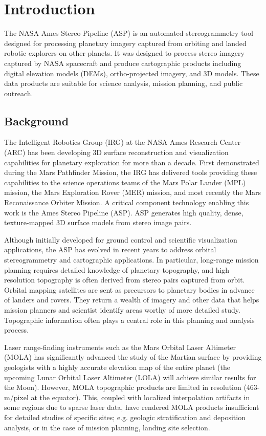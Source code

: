 \chapter{Introduction}

The NASA Ames Stereo Pipeline (ASP) is an automated stereogrammetry
tool designed for processing planetary imagery captured from orbiting
and landed robotic explorers on other planets.  It was designed to
process stereo imagery captured by NASA spacecraft and produce
cartographic products including digital elevation models (DEMs),
ortho-projected imagery, and 3D models.  These data products are
suitable for science analysis, mission planning, and public outreach.

\section{Background}

The Intelligent Robotics Group (IRG) at the NASA Ames Research Center
(ARC) has been developing 3D surface reconstruction and visualization
capabilities for planetary exploration for more than a decade.  First
demonstrated during the Mars Pathfinder Mission, the IRG has delivered
tools providing these capabilities to the science operations teams of
the Mars Polar Lander (MPL) mission, the Mars Exploration Rover (MER)
mission, and most recently the Mars Reconaissance Orbiter Mission. A
critical component technology enabling this work is the Ames Stereo
Pipeline (ASP).  ASP generates high quality, dense, texture-mapped
3D surface models from stereo image pairs.

Although initially developed for ground control and scientific
visualization applications, the ASP has evolved in recent years to
address orbital stereogrammetry and cartographic applications.  In
particular, long-range mission planning requires detailed knowledge of
planetary topography, and high resolution topography is often derived
from stereo pairs captured from orbit.  Orbital mapping satellites are
sent as precursors to planetary bodies in advance of landers and
rovers.  They return a wealth of imagery and other data that helps
mission planners and scientist identify areas worthy of more detailed
study. Topographic information often plays a central role in this
planning and analysis process.

Laser range-finding instruments such as the Mars Orbital Laser
Altimeter (MOLA) \cite{mola-ref} has signiﬁcantly advanced the study
of the Martian surface by providing geologists with a highly accurate
elevation map of the entire planet (the upcoming Lunar Orbital Laser
Altimeter (LOLA) \cite{lola-ref} will achieve similar results for the
Moon).  However, MOLA topographic products are limited in resolution
(463-m/pixel at the equator).  This, coupled with localized
interpolation artifacts in some regions due to sparse laser data, have
rendered MOLA products insufficient for detailed studies of speciﬁc
sites; e.g. geologic stratification and deposition analysis, or in the
case of mission planning, landing site selection.  

